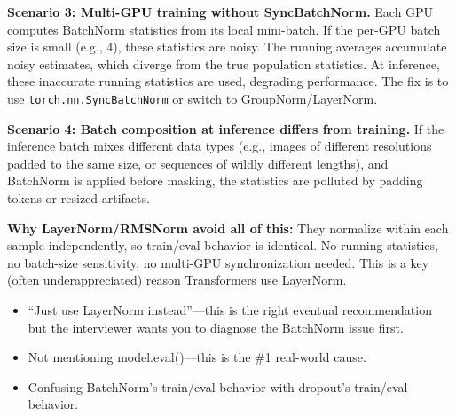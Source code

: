 \begin{interviewq}
\textbf{Scenario 3: Multi-GPU training without SyncBatchNorm.} Each GPU computes BatchNorm statistics from its local mini-batch. If the per-GPU batch size is small (e.g., 4), these statistics are noisy. The running averages accumulate noisy estimates, which diverge from the true population statistics. At inference, these inaccurate running statistics are used, degrading performance. The fix is to use \texttt{torch.nn.SyncBatchNorm} or switch to GroupNorm/LayerNorm.

\textbf{Scenario 4: Batch composition at inference differs from training.} If the inference batch mixes different data types (e.g., images of different resolutions padded to the same size, or sequences of wildly different lengths), and BatchNorm is applied before masking, the statistics are polluted by padding tokens or resized artifacts.

\textbf{Why LayerNorm/RMSNorm avoid all of this:} They normalize within each sample independently, so train/eval behavior is identical. No running statistics, no batch-size sensitivity, no multi-GPU synchronization needed. This is a key (often underappreciated) reason Transformers use LayerNorm.

\redflags
\begin{itemize}
    \item ``Just use LayerNorm instead''---this is the right eventual recommendation but the interviewer wants you to diagnose the BatchNorm issue first.
    \item Not mentioning model.eval()---this is the \#1 real-world cause.
    \item Confusing BatchNorm's train/eval behavior with dropout's train/eval behavior.
\end{itemize}



\end{interviewq}

